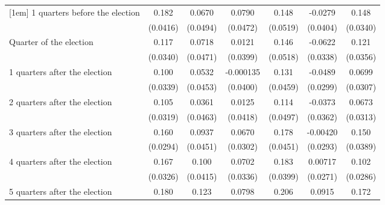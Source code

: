 \begin{table}[htbp]
\begin{tabular}{l*{6}{c}}
[1em]
 1 quarters before the election&       0.182\sym{***}&      0.0670         &      0.0790         &       0.148\sym{**} &     -0.0279         &       0.148\sym{***}\\
                    &    (0.0416)         &    (0.0494)         &    (0.0472)         &    (0.0519)         &    (0.0404)         &    (0.0340)         \\
[1em]
Quarter of the election&       0.117\sym{***}&      0.0718         &      0.0121         &       0.146\sym{**} &     -0.0622         &       0.121\sym{***}\\
                    &    (0.0340)         &    (0.0471)         &    (0.0399)         &    (0.0518)         &    (0.0338)         &    (0.0356)         \\
[1em]
 1 quarters after the election&       0.100\sym{**} &      0.0532         &   -0.000135         &       0.131\sym{**} &     -0.0489         &      0.0699\sym{*}  \\
                    &    (0.0339)         &    (0.0453)         &    (0.0400)         &    (0.0459)         &    (0.0299)         &    (0.0307)         \\
[1em]
 2 quarters after the election&       0.105\sym{***}&      0.0361         &      0.0125         &       0.114\sym{*}  &     -0.0373         &      0.0673\sym{*}  \\
                    &    (0.0319)         &    (0.0463)         &    (0.0418)         &    (0.0497)         &    (0.0362)         &    (0.0313)         \\
[1em]
 3 quarters after the election&       0.160\sym{***}&      0.0937\sym{*}  &      0.0670\sym{*}  &       0.178\sym{***}&    -0.00420         &       0.150\sym{***}\\
                    &    (0.0294)         &    (0.0451)         &    (0.0302)         &    (0.0451)         &    (0.0293)         &    (0.0389)         \\
[1em]
 4 quarters after the election&       0.167\sym{***}&       0.100\sym{*}  &      0.0702\sym{*}  &       0.183\sym{***}&     0.00717         &       0.102\sym{***}\\
                    &    (0.0326)         &    (0.0415)         &    (0.0336)         &    (0.0399)         &    (0.0271)         &    (0.0286)         \\
[1em]
 5 quarters after the election&       0.180\sym{***}&       0.123\sym{**} &      0.0798\sym{*}  &       0.206\sym{***}&      0.0915\sym{**} &       0.172\sym{***}\\

\end{tabular}
\end{table}
